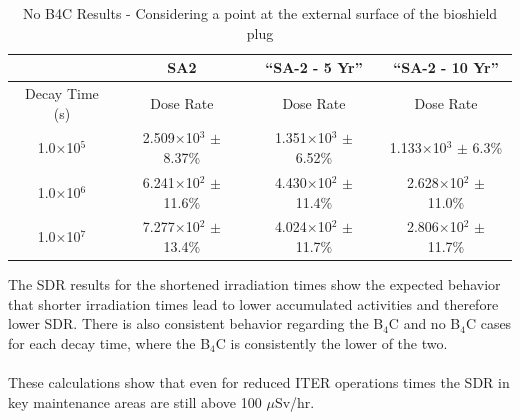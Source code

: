 \documentclass[12pt]{article}
\begin{document}
\begin{table}[ht!]
   \centering      
   \begin{tabular}{| c | c | c | c |}
      \hline
      & SA2 & ``SA-2 - 5 Yr'' & ``SA-2 - 10 Yr'' \\
      \hline
      Decay Time (s) & Dose Rate & Dose Rate & Dose Rate \\
      \hline
      1.0$\times$10$^{5}$ & 2.509$\times$10$^{3}$ $\pm$ 8.37\% & 1.351$\times$10$^{3}$ $\pm$ 6.52\% & 1.133$\times$10$^{3}$ $\pm$ 6.3\%\\
      1.0$\times$10$^{6}$ & 6.241$\times$10$^{2}$ $\pm$ 11.6\% & 4.430$\times$10$^{2}$ $\pm$ 11.4\% & 2.628$\times$10$^{2}$ $\pm$ 11.0\%\\
      1.0$\times$10$^{7}$ & 7.277$\times$10$^{2}$ $\pm$ 13.4\% & 4.024$\times$10$^{2}$ $\pm$ 11.7\% & 2.806$\times$10$^{2}$ $\pm$ 11.7\%\\
      \hline
\end{tabular}
\caption{No B4C Results - Considering a point at the external surface of the bioshield plug}
\label{tab:nob4c_summary_scenario}
\end{table}

The SDR results for the shortened irradiation times show the expected behavior 
that shorter irradiation times lead to lower accumulated activities and therefore
lower SDR.  There is also consistent behavior regarding the B$_4$C and no B$_4$C
cases for each decay time, where the B$_4$C is consistently the lower of the two.
\\
\\
These calculations show that even for reduced ITER operations times the SDR
in key maintenance areas are still above 100 $\mu$Sv/hr. 
\newpage


\newpage
\clearpage
\end{document}
